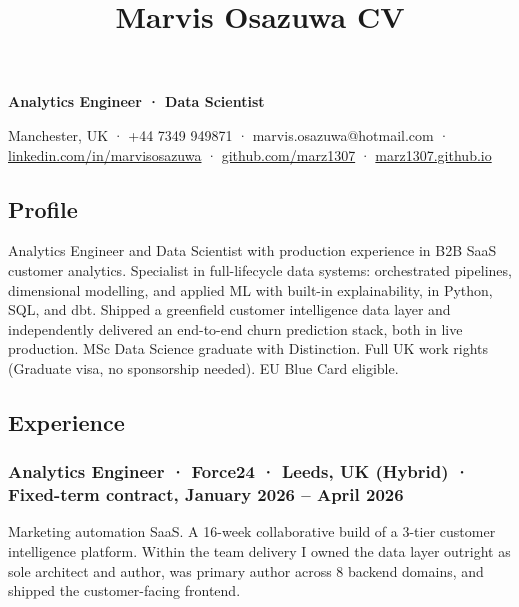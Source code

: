 \documentclass[
  10pt,
]{article}
\title{Marvis Osazuwa CV}
\author{}
\date{}
\begin{document}
\maketitle

\textbf{Analytics Engineer · Data Scientist}

Manchester, UK · +44 7349 949871 · marvis.osazuwa@hotmail.com ·
\href{https://linkedin.com/in/marvisosazuwa}{linkedin.com/in/marvisosazuwa}
· \href{https://github.com/marz1307}{github.com/marz1307} ·
\href{https://marz1307.github.io}{marz1307.github.io}

\subsection{Profile}\label{profile}

Analytics Engineer and Data Scientist with production experience in B2B
SaaS customer analytics. Specialist in full-lifecycle data systems:
orchestrated pipelines, dimensional modelling, and applied ML with
built-in explainability, in Python, SQL, and dbt. Shipped a greenfield
customer intelligence data layer and independently delivered an
end-to-end churn prediction stack, both in live production. MSc Data
Science graduate with Distinction. Full UK work rights (Graduate
visa, no sponsorship needed). EU Blue Card eligible.

\subsection{Experience}\label{experience}

\subsubsection{Analytics Engineer · Force24 · Leeds, UK (Hybrid) ·
Fixed-term contract, January 2026 -- April
2026}\label{analytics-engineer-force24-leeds-uk-hybrid-fixed-term-contract-january-2026-april-2026}

Marketing automation SaaS. A 16-week collaborative build of a 3-tier
customer intelligence platform. Within the team delivery I owned the
data layer outright as sole architect and author, was primary author
across 8 backend domains, and shipped the customer-facing frontend.
\end{document}
